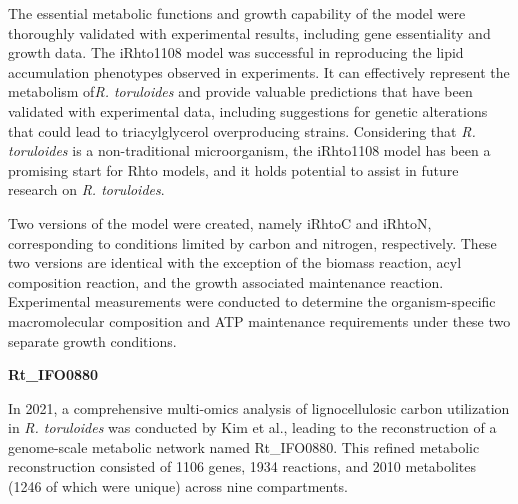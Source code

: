 
The essential metabolic functions and growth capability of the model were thoroughly validated with experimental results, including gene essentiality \cite{Coradetti2018} and growth data. The iRhto1108 model was successful in reproducing the lipid accumulation phenotypes observed in experiments. It can effectively represent the metabolism of\textit{R. toruloides} and provide valuable predictions that have been validated with experimental data, including suggestions for genetic alterations that could lead to triacylglycerol overproducing strains. \cite{Dinh2019} Considering that \textit{R. toruloides} is a non-traditional microorganism, the iRhto1108 model has been a promising start for Rhto models, and it holds potential to assist in future research on \textit{R. toruloides}. 

Two versions of the model were created, namely iRhtoC and iRhtoN, corresponding to conditions limited by carbon and nitrogen, respectively. These two versions are identical with the exception of the biomass reaction, acyl composition reaction, and the growth associated maintenance reaction. Experimental measurements were conducted to determine the organism-specific macromolecular composition and ATP maintenance requirements under these two separate growth conditions. \cite{Dinh2019}


\textbf{Rt\_IFO0880}

In 2021, a comprehensive multi-omics analysis of lignocellulosic carbon utilization in \textit{R. toruloides} was conducted by Kim et al., leading to the reconstruction of a genome-scale metabolic network named Rt\_IFO0880. This refined metabolic reconstruction consisted of 1106 genes, 1934 reactions, and 2010 metabolites (1246 of which were unique) across nine compartments. \cite{Kim2021}

